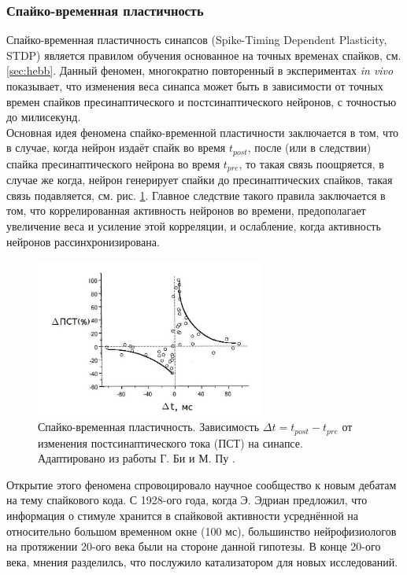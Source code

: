 \documentclass[a4paper,10pt]{article}
\begin{document}
\subsubsection{Спайко-временная пластичность}\label{sec:stdp}
\indent Спайко-временная пластичность синапсов (Spike-Timing Dependent Plasticity, STDP) является правилом обучения основанное на точных временах спайков, см. \ref{sec:hebb}. Данный феномен, многократно повторенный в экспериментах \textit{in vivo} показывает, что изменения веса синапса может быть в зависимости от точных времен спайков пресинаптического и постсинаптического нейронов, с точностью до милисекунд.\\
\indent Основная идея феномена спайко-временной пластичности заключается в том, что в случае, когда нейрон издаёт спайк во время $t_{post}$, после (или в следствии) спайка пресинаптического нейрона во время $t_{pre}$, то такая связь поощряется, в случае же когда, нейрон генерирует спайки до пресинаптических спайков, такая связь подавляется, см. рис. \ref{stdp_pic}. Главное следствие такого правила заключается в том, что коррелированная активность нейронов во времени, предополагает увеличение веса и усиление этой корреляции, и ослабление, когда активность нейронов рассинхронизирована.\\
\begin{figure}[ht]
\centering
\captionsetup{justification=centering,margin=1cm}
\includegraphics[width=75mm,scale=0.7]{stdp.jpg}
\caption{Спайко-временная пластичность. Зависимость $\Delta t = t_{post} - t_{pre}$ от изменения постсинаптического тока (ПСТ) на синапсе. Адаптировано из работы Г. Би и М. Пу \cite{stdp4}. }
\label{stdp_pic}
\end{figure}
\FloatBarrier
\indent Открытие этого феномена спровоцировало научное сообщество к новым дебатам на тему спайкового кода. С 1928-ого года, когда Э. Эдриан \cite{rate_first} предложил, что информация о стимуле хранится в спайковой активности усреднённой на относительно большом временном окне (100 мс), большинство нейрофизиологов на протяжении 20-ого века были на стороне данной гипотезы. В конце 20-ого века, мнения разделилсь, что послужило катализатором для новых исследований.\\
\end{document}
